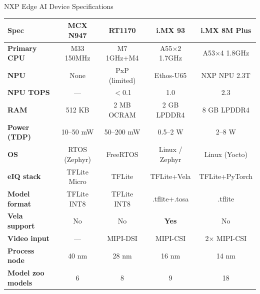 \documentclass[aspectratio=169]{beamer}
\begin{document}
\begin{frame}{NXP Edge AI Device Specifications}
\small
\begin{tabular}{lcccc}
\toprule
\textbf{Spec} & \textbf{MCX N947} & \textbf{RT1170} & \textbf{i.MX 93} & \textbf{i.MX 8M Plus}\\
\midrule
\textbf{Primary CPU} & M33 150MHz & M7 1GHz+M4 & A55$\times$2 1.7GHz & A53$\times$4 1.8GHz\\
\textbf{NPU} & None & PxP (limited) & Ethos-U65 & NXP NPU 2.3T\\
\textbf{NPU TOPS} & --- & $<$0.1 & 1.0 & 2.3\\
\textbf{RAM} & 512 KB & 2 MB OCRAM & 2 GB LPDDR4 & 8 GB LPDDR4\\
\textbf{Power (TDP)} & 10--50 mW & 50--200 mW & 0.5--2 W & 2--8 W\\
\textbf{OS} & RTOS (Zephyr) & FreeRTOS & Linux / Zephyr & Linux (Yocto)\\
\textbf{eIQ stack} & TFLite Micro & TFLite & TFLite+Vela & TFLite+PyTorch\\
\textbf{Model format} & TFLite INT8 & TFLite INT8 & .tflite+.tosa & .tflite\\
\textbf{Vela support} & No & No & \textbf{Yes} & No\\
\textbf{Video input} & --- & MIPI-DSI & MIPI-CSI & 2$\times$ MIPI-CSI\\
\textbf{Process node} & 40 nm & 28 nm & 16 nm & 14 nm\\
\textbf{Model zoo models} & 6 & 8 & 9 & 18\\
\bottomrule
\end{tabular}
\end{frame}
\end{document}
